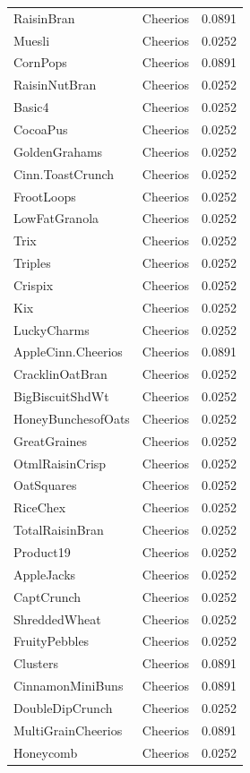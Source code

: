 \begin{table}[!htbp]
\begin{tabular}{lll}
\\
RaisinBran & Cheerios & 0.0891
\\
Muesli & Cheerios & 0.0252
\\
CornPops & Cheerios & 0.0891
\\
RaisinNutBran & Cheerios & 0.0252
\\
Basic4 & Cheerios & 0.0252
\\
CocoaPus & Cheerios & 0.0252
\\
GoldenGrahams & Cheerios & 0.0252
\\
Cinn.ToastCrunch & Cheerios & 0.0252
\\
FrootLoops & Cheerios & 0.0252
\\
LowFatGranola & Cheerios & 0.0252
\\
Trix & Cheerios & 0.0252
\\
Triples & Cheerios & 0.0252
\\
Crispix & Cheerios & 0.0252
\\
Kix & Cheerios & 0.0252
\\
LuckyCharms & Cheerios & 0.0252
\\
AppleCinn.Cheerios & Cheerios & 0.0891
\\
CracklinOatBran & Cheerios & 0.0252
\\
BigBiscuitShdWt & Cheerios & 0.0252
\\
HoneyBunchesofOats & Cheerios & 0.0252
\\
GreatGraines & Cheerios & 0.0252
\\
OtmlRaisinCrisp & Cheerios & 0.0252
\\
OatSquares & Cheerios & 0.0252
\\
RiceChex & Cheerios & 0.0252
\\
TotalRaisinBran & Cheerios & 0.0252
\\
Product19 & Cheerios & 0.0252
\\
AppleJacks & Cheerios & 0.0252
\\
CaptCrunch & Cheerios & 0.0252
\\
ShreddedWheat & Cheerios & 0.0252
\\
FruityPebbles & Cheerios & 0.0252
\\
Clusters & Cheerios & 0.0891
\\
CinnamonMiniBuns & Cheerios & 0.0891
\\
DoubleDipCrunch & Cheerios & 0.0252
\\
MultiGrainCheerios & Cheerios & 0.0891
\\
Honeycomb & Cheerios & 0.0252
\\

\end{tabular}
\end{table}
